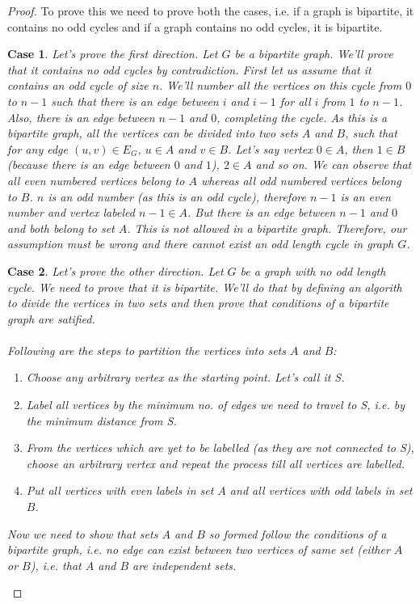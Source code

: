\documentclass{article}
\newtheorem{case}{Case}
\begin{document}
\begin{proof}
    To prove this we need to prove both the cases, i.e. if a graph is bipartite, it contains no odd cycles and if a graph contains no odd cycles, it is bipartite.\\

    \begin{case}
        Let's prove the first direction. Let $G$ be a bipartite graph. We'll prove that it contains no odd cycles by contradiction. First let us assume that it contains an odd cycle of size $n$. We'll number all the vertices on this cycle from $0$ to $n-1$ such that there is an edge between $i$ and $i-1$ for all $i$ from $1$ to $n-1$. Also, there is an edge between $n-1$ and $0$, completing the cycle. As this is a bipartite graph, all the vertices can be divided into two sets $A$ and $B$, such that for any edge $(u,v) \in E_{G}$, $u \in A$ and $v \in B$. Let's say vertex $0 \in A$, then $1 \in B$ (because there is an edge between $0$ and $1$), $2 \in A$ and so on. We can observe that all even numbered vertices belong to $A$ whereas all odd numbered vertices belong to $B$. $n$ is an odd number (as this is an odd cycle), therefore $n-1$ is an even number and vertex labeled $n-1 \in A$. But there is an edge between $n-1$ and $0$ and both belong to set $A$. This is not allowed in a bipartite graph. Therefore, our assumption must be wrong and there cannot exist an odd length cycle in graph $G$.
    \end{case}

    \begin{case}
        Let's prove the other direction. Let $G$ be a graph with no odd length cycle. We need to prove that it is bipartite. We'll do that by defining an algorith to divide the vertices in two sets and then prove that conditions of a bipartite graph are satified.\\
        \\Following are the steps to partition the vertices into sets $A$ and $B$:
        \begin{enumerate}
            \item Choose any arbitrary vertex as the starting point. Let's call it S.
            \item Label all vertices by the minimum no. of edges we need to travel to S, i.e. by the minimum distance from S.
            \item From the vertices which are yet to be labelled (as they are not connected to S), choose an arbitrary vertex and repeat the process till all vertices are labelled.
            \item Put all vertices with even labels in set $A$ and all vertices with odd labels in set $B$.
        \end{enumerate}
        Now we need to show that sets $A$ and $B$ so formed follow the conditions of a bipartite graph, i.e. no edge can exist between two vertices of same set (either $A$ or $B$), i.e. that $A$ and $B$ are independent sets.
    \end{case}
\end{proof}
  
\end{document}
